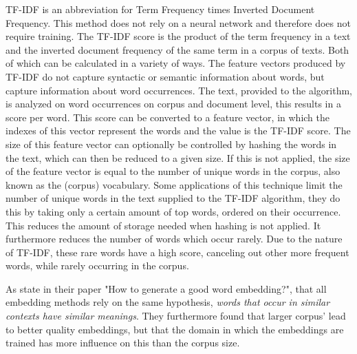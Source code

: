 \documentclass[../../Thesis.tex]{subfiles}
\begin{document}
\begin{jumpin}
TF-IDF is an abbreviation for Term Frequency times Inverted Document Frequency. This method does not rely on a neural network and therefore does not require training. The TF-IDF score is the product of the term frequency in a text and the inverted document frequency of the same term in a corpus of texts. Both of which can be calculated in a variety of ways. The feature vectors produced by TF-IDF do not capture syntactic or semantic information about words, but capture information about word occurrences. The text, provided to the algorithm, is analyzed on word occurrences on corpus and document level, this results in a score per word. This score can be converted to a feature vector, in which the indexes of this vector represent the words and the value is the TF-IDF score. The size of this feature vector can optionally be controlled by hashing the words in the text, which can then be reduced to a given size. If this is not applied, the size of the feature vector is equal to the number of unique words in the corpus, also known as the (corpus) vocabulary. Some applications of this technique limit the number of unique words in the text supplied to the TF-IDF algorithm, they do this by taking only a certain amount of top words, ordered on their occurrence. This reduces the amount of storage needed when hashing is not applied. It furthermore reduces the number of words which occur rarely. Due to the nature of TF-IDF, these rare words have a high score, canceling out other more frequent words, while rarely occurring in the corpus.
\end{jumpin}

As \citet{lai2016generate} state in their paper "How to generate a good word embedding?", that all embedding methods rely on the same hypothesis, \textit{words that occur in similar contexts have similar meanings}. They furthermore found that larger corpus' lead to better quality embeddings, but that the domain in which the embeddings are trained has more influence on this than the corpus size. 
\end{document}
